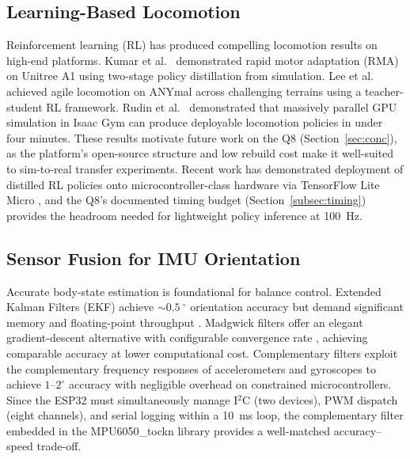 \documentclass[journal]{IEEEtran}
\newcommand{\dg}{^{\circ}}
\begin{document}
\subsection{Learning-Based Locomotion}
Reinforcement learning (RL) has produced compelling
locomotion results on high-end platforms.
Kumar et al.\ \cite{kumar2021rma} demonstrated rapid motor
adaptation (RMA) on Unitree A1 using two-stage policy
distillation from simulation.
Lee et al.\ \cite{lee2020learning} achieved agile locomotion
on ANYmal across challenging terrains using a
teacher-student RL framework.
Rudin et al.\ \cite{rudin2022learning} demonstrated that
massively parallel GPU simulation in Isaac Gym can produce
deployable locomotion policies in under four minutes.
These results motivate future work on the Q8 (Section~\ref{sec:conc}),
as the platform's open-source structure and low rebuild cost
make it well-suited to sim-to-real transfer experiments.
Recent work has demonstrated deployment of distilled RL policies
onto microcontroller-class hardware via TensorFlow Lite Micro
\cite{hwangbo2019learning,rudin2022learning}, and the Q8's
documented timing budget (Section~\ref{subsec:timing}) provides
the headroom needed for lightweight policy inference at
\SI{100}{\hertz}.
\subsection{Sensor Fusion for IMU Orientation}
Accurate body-state estimation is foundational for balance
control.
Extended Kalman Filters (EKF) achieve $\sim\SI{0.5}{\dg}$
orientation accuracy but demand significant memory and
floating-point throughput
\cite{sabatini2011kalman,vitali2021robust}.
Madgwick filters offer an elegant gradient-descent alternative
with configurable convergence rate \cite{madgwick2010efficient},
achieving comparable accuracy at lower computational cost.
Complementary filters exploit the complementary frequency
responses of accelerometers and gyroscopes to achieve
$1$--$2\dg$ accuracy \cite{oz2022complementary} with
negligible overhead on constrained microcontrollers.
Since the ESP32 must simultaneously manage I$^2$C (two devices),
PWM dispatch (eight channels), and serial logging within a
\SI{10}{\milli\second} loop, the complementary filter embedded
in the MPU6050\_tockn library provides a well-matched
accuracy--speed trade-off.
\end{document}
